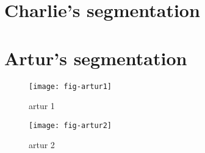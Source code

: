 
\clearpage \newpage



\clearpage \newpage



\section{Charlie's segmentation}



\clearpage \newpage

\section{Artur's segmentation}

\begin{figure}[bt]
\texttt{[image: fig-artur1]}
\caption
{
artur 1
}
\label{fig:artur1}
\end{figure}

\newpage

\begin{figure}[bt]
\texttt{[image: fig-artur2]}
\caption
{
artur 2
}
\label{fig:artur2}
\end{figure}


\clearpage \newpage
